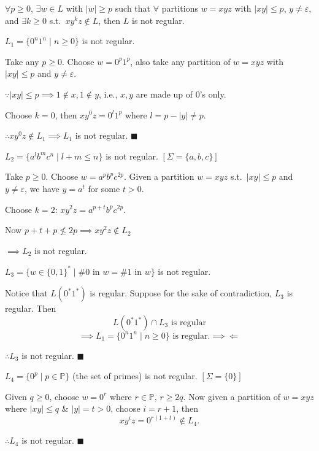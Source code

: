 \begin{blackbox}
\begin{corollary}
$\forall p \geq 0$, $\exists w \in L$ with $|w| \geq p$ such that $\forall$ partitions $w = xyz$ with $|xy| \leq p$, $y \neq \varepsilon$, and $\exists k \geq 0$ s.t.\ $xy^k z \notin L$, then $L$ is not regular.
\end{corollary}
\end{blackbox}

\begin{example}
$L_1 = \{0^n 1^n \mid n \geq 0\}$ is not regular.

Take any $p \geq 0$. Choose $w = 0^p 1^p$, also take any partition of $w = xyz$ with $|xy| \leq p$ and $y \neq \varepsilon$.

$\because |xy| \leq p \implies 1 \notin x, 1 \notin y$, i.e., $x, y$ are made up of $0$'s only.

Choose $k = 0$, then $xy^0 z = 0^l 1^p$ where $l = p - |y| \neq p$.

$\therefore xy^0 z \notin L_1 \implies L_1$ is not regular. \hfill$\blacksquare$
\end{example}

\begin{example}
$L_2 = \{a^l b^m c^n \mid l + m \leq n\}$ is not regular. \quad $[\Sigma = \{a,b,c\}]$

Take $p \geq 0$. Choose $w = a^p b^p c^{2p}$. Given a partition $w = xyz$ s.t.\ $|xy| \leq p$ and $y \neq \varepsilon$, we have $y = a^t$ for some $t > 0$.

Choose $k = 2$: $xy^2 z = a^{p+t} b^p c^{2p}$.

Now $p + t + p \not\leq 2p \implies xy^2 z \notin L_2$

$\implies L_2$ is not regular.
\end{example}

\begin{example}
$L_3 = \{ w \in \{0,1\}^* \mid \#0 \text{ in } w = \#1 \text{ in } w \}$ is not regular.

Notice that $L(0^*1^*)$ is regular. Suppose for the sake of contradiction, $L_3$ is regular. Then
\[
L(0^*1^*) \cap L_3 \text{ is regular}
\]
\[
\implies L_1 = \{0^n 1^n \mid n \geq 0\} \text{ is regular.} \implies\Leftarrow
\]

$\therefore L_3$ is not regular. \hfill$\blacksquare$
\end{example}

\begin{example}
$L_4 = \{0^p \mid p \in \mathbb{P}\}$ (the set of primes) is not regular. \quad $[\Sigma = \{0\}]$

Given $q \geq 0$, choose $w = 0^r$ where $r \in \mathbb{P}$, $r \geq 2q$. Now given a partition of $w = xyz$ where $|xy| \leq q$ \& $|y| = t > 0$, choose $i = r+1$, then
\[
xy^i z = 0^{r(1+t)} \notin L_4.
\]

$\therefore L_4$ is not regular. \hfill$\blacksquare$
\end{example}

